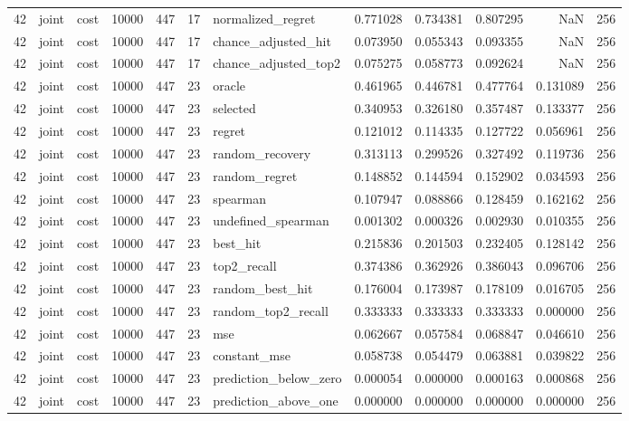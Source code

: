 \begin{tabular}{rllrrrlrrrrr}
42 & joint & cost & 10000 & 447 & 17 & normalized_regret & 0.771028 & 0.734381 & 0.807295 & NaN & 256 \\
42 & joint & cost & 10000 & 447 & 17 & chance_adjusted_hit & 0.073950 & 0.055343 & 0.093355 & NaN & 256 \\
42 & joint & cost & 10000 & 447 & 17 & chance_adjusted_top2 & 0.075275 & 0.058773 & 0.092624 & NaN & 256 \\
42 & joint & cost & 10000 & 447 & 23 & oracle & 0.461965 & 0.446781 & 0.477764 & 0.131089 & 256 \\
42 & joint & cost & 10000 & 447 & 23 & selected & 0.340953 & 0.326180 & 0.357487 & 0.133377 & 256 \\
42 & joint & cost & 10000 & 447 & 23 & regret & 0.121012 & 0.114335 & 0.127722 & 0.056961 & 256 \\
42 & joint & cost & 10000 & 447 & 23 & random_recovery & 0.313113 & 0.299526 & 0.327492 & 0.119736 & 256 \\
42 & joint & cost & 10000 & 447 & 23 & random_regret & 0.148852 & 0.144594 & 0.152902 & 0.034593 & 256 \\
42 & joint & cost & 10000 & 447 & 23 & spearman & 0.107947 & 0.088866 & 0.128459 & 0.162162 & 256 \\
42 & joint & cost & 10000 & 447 & 23 & undefined_spearman & 0.001302 & 0.000326 & 0.002930 & 0.010355 & 256 \\
42 & joint & cost & 10000 & 447 & 23 & best_hit & 0.215836 & 0.201503 & 0.232405 & 0.128142 & 256 \\
42 & joint & cost & 10000 & 447 & 23 & top2_recall & 0.374386 & 0.362926 & 0.386043 & 0.096706 & 256 \\
42 & joint & cost & 10000 & 447 & 23 & random_best_hit & 0.176004 & 0.173987 & 0.178109 & 0.016705 & 256 \\
42 & joint & cost & 10000 & 447 & 23 & random_top2_recall & 0.333333 & 0.333333 & 0.333333 & 0.000000 & 256 \\
42 & joint & cost & 10000 & 447 & 23 & mse & 0.062667 & 0.057584 & 0.068847 & 0.046610 & 256 \\
42 & joint & cost & 10000 & 447 & 23 & constant_mse & 0.058738 & 0.054479 & 0.063881 & 0.039822 & 256 \\
42 & joint & cost & 10000 & 447 & 23 & prediction_below_zero & 0.000054 & 0.000000 & 0.000163 & 0.000868 & 256 \\
42 & joint & cost & 10000 & 447 & 23 & prediction_above_one & 0.000000 & 0.000000 & 0.000000 & 0.000000 & 256 \\

\end{tabular}
